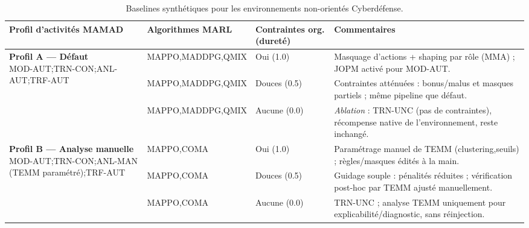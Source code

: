 \begin{table}[h!]
  \centering
  \caption{Baselines synthétiques pour les environnements non-orientés Cyberdéfense.}
  \label{tab:baselines_non_cyberdefense}
  \renewcommand{\arraystretch}{1}
  \tiny
  \begin{tabularx}{\textwidth}{p{3.8cm}p{2.5cm}p{2.8cm}p{4.5cm}}
    \toprule
    \textbf{Profil d'activités MAMAD} & \textbf{Algorithmes MARL} & \textbf{Contraintes org. (dureté)} & \textbf{Commentaires}                                                                                   \\
    \midrule
    \multirow{3}{*}{\parbox{3.8cm}{\textbf{Profil A — Défaut}                                                                                                                                                    \\MOD-AUT;\;TRN-CON;\;ANL-AUT;\;TRF-AUT}}
                                      & MAPPO,\;MADDPG,\;QMIX     & Oui (1.0)                          & Masquage d’actions + shaping par rôle (MMA) ; JOPM activé pour MOD-AUT.                                 \\
                                      & MAPPO,\;MADDPG,\;QMIX     & Douces (0.5)                       & Contraintes atténuées : bonus/malus et masques partiels ; même pipeline que défaut.                     \\
                                      & MAPPO,\;MADDPG,\;QMIX     & Aucune (0.0)                       & \textit{Ablation} : TRN-UNC (pas de contraintes), récompense native de l’environnement, reste inchangé. \\
    \midrule
    \multirow{3}{*}{\parbox{3.8cm}{\textbf{Profil B — Analyse manuelle}                                                                                                                                          \\MOD-AUT;\;TRN-CON;\;ANL-MAN (TEMM paramétré);\;TRF-AUT}}
                                      & MAPPO,\;COMA              & Oui (1.0)                          & Paramétrage manuel de TEMM (clustering,\;seuils) ; règles/masques édités à la main.                     \\
                                      & MAPPO,\;COMA              & Douces (0.5)                       & Guidage souple : pénalités réduites ; vérification post-hoc par TEMM ajusté manuellement.               \\
                                      & MAPPO,\;COMA              & Aucune (0.0)                       & TRN-UNC ; analyse TEMM uniquement pour explicabilité/diagnostic, sans réinjection.                      \\

\end{tabularx}
\end{table}
